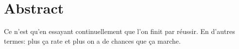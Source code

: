 \documentclass[11pt, letterpaper]{book}
\begin{document}
    

    \frontmatter
    \chapter*{\centering Abstract}
        Ce n'est qu'en essayant continuellement que l'on finit par réussir.
        En d'autres termes: plus ça rate et plus on a de chances que ça marche.
    \setcounter{tocdepth}{2}
    \tableofcontents

    \listoffigures

    \listoftables

    \setlength{\parskip}{5pt}

    

    \mainmatter
    

    

    

    \appendix
    

    
    
\end{document}

